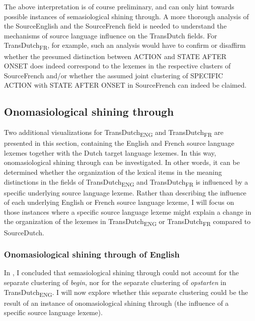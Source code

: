 The above interpretation is of course preliminary, and can only hint towards possible instances of semasiological shining through. A more thorough analysis of the SourceEnglish and the SourceFrench field is needed to understand the mechanisms of source language influence on the TransDutch fields. For TransDutch\textsubscript{FR}, for example, such an analysis would have to confirm or disaffirm whether the presumed distinction between ACTION and STATE AFTER ONSET does indeed correspond to the lexemes in the respective clusters of SourceFrench and/or whether the assumed joint clustering of {SPECIFIC} ACTION with STATE AFTER ONSET in SourceFrench can indeed be claimed.

\subsection{Onomasiological shining through}
\label{sec:4.6.2}  
Two additional visualizations for TransDutch\textsubscript{ENG} and TransDutch\textsubscript{FR} are presented in this section, containing the English and French source language lexemes together with the Dutch target language lexemes. In this way, onomasiological shining through can be investigated. In other words, it can be determined whether the organization of the lexical items in the meaning distinctions in the fields of TransDutch\textsubscript{ENG} and TransDutch\textsubscript{FR} is influenced by a specific underlying source language lexeme. Rather than describing the influence of each underlying English or French source language lexeme, I will focus on those instances where a specific source language lexeme might explain a change in the organization of the lexemes in TransDutch\textsubscript{ENG} or TransDutch\textsubscript{FR} compared to SourceDutch.


\subsubsection{Onomasiological shining through of English}
\label{sec:4.6.2.1}  
In , I concluded that semasiological shining through could not account for the separate clustering of \textit{begin}, nor for the separate clustering of \textit{opstarten} in TransDutch\textsubscript{ENG}. I will now explore whether this separate clustering could be the result of an instance of onomasiological shining through (the influence of a specific source language lexeme).

